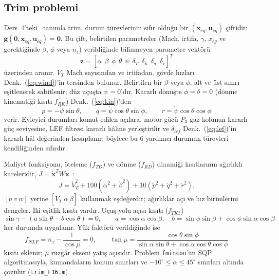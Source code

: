 \documentclass[conf]{new-aiaa}
\begin{document}
\subsection{Trim problemi}
Ders~4'teki~\cite{lec4} tanımla trim, durum türevlerinin sıfır olduğu bir $(\mathbf x_{eq},\mathbf u_{eq})$ çiftidir: $\mathbf g(\mathbf 0,\mathbf x_{eq},\mathbf u_{eq})=\mathbf 0$. Bu çift, belirtilen parametreler (Mach, irtifa, $\gamma$, $x_{cg}$ ve gerektiğinde $\beta$, $\phi$ veya $n_z$) verildiğinde bilinmeyen parametre vektörü
\begin{equation}
\mathbf z=[\alpha\ \ \beta\ \ \phi\ \ \theta\ \ \dot\psi\ \ \delta_T\ \ \delta_h\ \ \delta_a\ \ \delta_r]^T
\end{equation}
üzerinden aranır. $V_T$ Mach sayısından ve irtifadan, gövde hızları Denk.~(\ref{eq:wind})'in tersinden bulunur. Belirtilen bir $\beta$ veya $\phi$, alt ve üst sınırı eşitlenerek sabitlenir; düz uçuşta $\dot\psi=0$'dır. Kararlı dönüşte $\dot\phi=\dot\theta=0$ (dönme kinematiği kısıtı $f_{RK}$) Denk.~(\ref{eq:kin})'den
\begin{equation}
p=-\dot\psi\sin\theta,\qquad q=\dot\psi\cos\theta\sin\phi,\qquad r=\dot\psi\cos\theta\cos\phi
\end{equation}
verir. Eyleyici durumları komut edilen açılara, motor gücü $P_3$ gaz kolunun kararlı güç seviyesine, LEF filtresi kararlı hâline yerleştirilir ve $\delta_{lef}$ Denk.~(\ref{eq:lef})'in kararlı hâl değerinden hesaplanır; böylece bu 6 yardımcı durumun türevleri kendiliğinden sıfırdır.

Maliyet fonksiyonu, öteleme ($f_{TD}$) ve dönme ($f_{RD}$) dinamiği kısıtlarının ağırlıklı kareleridir, $J=\dot{\mathbf x}^TW\dot{\mathbf x}$~\cite{lec4,slj}:
\begin{equation}
J=\dot V_T^2+100(\dot\alpha^2+\dot\beta^2)+10(\dot p^2+\dot q^2+\dot r^2).
\end{equation}
$[\dot u\ \dot v\ \dot w]$ yerine $[\dot V_T\ \dot\alpha\ \dot\beta]$ kullanmak eşdeğerdir; ağırlıklar açı ve hız birimlerini dengeler. İki eşitlik kısıtı vardır. Uçuş yolu açısı kısıtı ($f_{TK3}$)
\begin{equation}
\sin\gamma-(a\sin\theta-b\cos\theta)=0,\qquad a=\cos\alpha\cos\beta,\quad b=\sin\phi\sin\beta+\cos\phi\sin\alpha\cos\beta
\end{equation}
her durumda uygulanır. Yük faktörü verildiğinde ise
\begin{equation}
f_{NLF}=n_z-\frac{1}{\cos\mu}=0,\qquad \tan\mu=\frac{\cos\theta\sin\phi}{\sin\alpha\sin\theta+\cos\alpha\cos\theta\cos\phi}
\end{equation}
kısıtı eklenir; $\mu$ rüzgâr ekseni yatış açısıdır. Problem \texttt{fmincon}'un SQP algoritmasıyla, kumandaların konum sınırları ve $-10^\circ\le\alpha\le45^\circ$ sınırları altında çözülür (\texttt{trim\_F16.m}).
\end{document}
